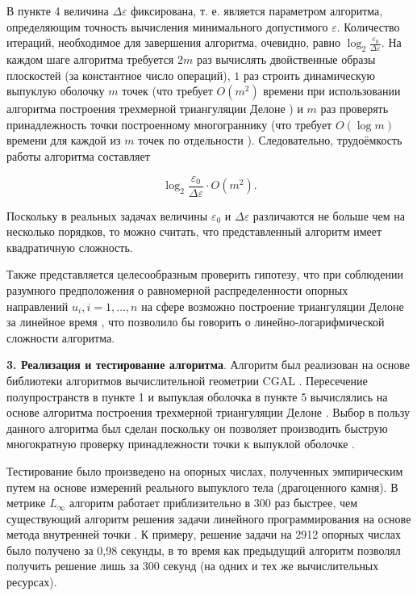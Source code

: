 \documentclass[a4paper, 10pt]{article}
\theoremstyle{definition}
\theoremstyle{plain}
\theoremstyle{plain}
\begin{document}
В пункте 4 величина $\Delta \varepsilon$ фиксирована, т. е. является
параметром алгоритма, определяющим точность вычисления минимального допустимого
$\varepsilon$. Количество итераций, необходимое для завершения алгоритма,
очевидно, равно $\log_{2} \frac{\varepsilon_{0}}{\Delta \varepsilon}$. На каждом
шаге алгоритма требуется $2m$ раз вычислять двойственные образы плоскостей (за
константное число операций), $1$ раз строить динамическую выпуклую оболочку
$m$ точек (что требует $O(m^2)$ времени при использовании алгоритма
построения трехмерной триангуляции Делоне \cite{Devillers}) и $m$ раз проверять
принадлежность точки построенному многограннику (что требует $O(\log m)$
времени для каждой из $m$ точек по отдельности \cite{Devillers}).
Следовательно, трудоёмкость работы алгоритма составляет

\begin{equation*}
 \log_{2} \frac{\varepsilon_{0}}{\Delta \varepsilon} \cdot O(m^2).
\end{equation*}

Поскольку в реальных задачах величины $\varepsilon_{0}$ и
$\Delta \varepsilon$ различаются не больше чем на несколько порядков, то
можно считать, что представленный алгоритм имеет квадратичную сложность.

Также представляется целесообразным проверить гипотезу, что при соблюдении
разумного предположения о равномерной распределенности опорных направлений
$u_i, i = 1, \ldots, n$ на сфере возможно построение триангуляции Делоне
за линейное время \cite{Attali}, что позволило бы говорить о
линейно-логарифмической сложности алгоритма.

\textbf{3. Реализация и тестирование алгоритма}.
Алгоритм был реализован на основе библиотеки алгоритмов вычислительной
геометрии CGAL \cite{cgal}. Пересечение полупространств в пункте 1 и выпуклая
оболочка в пункте 5 вычислялись на основе алгоритма построения трехмерной
триангуляции Делоне \cite{Devillers}. Выбор в пользу данного алгоритма был
сделан поскольку он позволяет производить быструю многократную проверку
принадлежности точки к выпуклой оболочке \cite{Devillers}.

Тестирование было произведено на опорных числах, полученных эмпирическим путем
на основе измерений реального выпуклого тела (драгоценного камня).
В метрике $L_{\infty}$ алгоритм работает приблизительно в 300
раз быстрее, чем существующий алгоритм решения задачи линейного программирования
на основе метода внутренней точки \cite{Ipopt}. К примеру, решение задачи на
2912 опорных числах было получено за 0,98 секунды, в то время как
предыдущий алгоритм позволял получить решение лишь за 300 секунд \cite{palachev}
(на одних и тех же вычислительных ресурсах).
\end{document}

